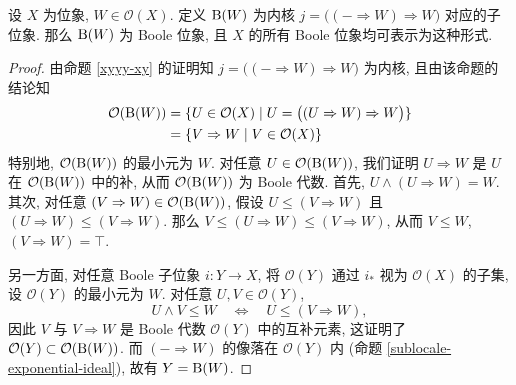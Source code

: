 
\begin{propdef}
	[label={Boolean-sublocale}]
	{}
	设 $X$ 为位象, $W\in\mathcal O(X)$.
	定义 $\text{B}(W)$ 为内核 $j = \big((-\Rightarrow W) \Rightarrow W\big)$ 对应的子位象.
	那么 $\text{B}(W)$ 为 Boole 位象, 且 $X$ 的所有 Boole 位象均可表示为这种形式.
\end{propdef}
\begin{proof}
	由命题 \ref{xyyy-xy} 的证明知 $j = \big((-\Rightarrow W) \Rightarrow W\big)$ 为内核,
	且由该命题的结论知
	$$
	\begin{aligned}
		\mathcal O(\text{B}(W)) &= \{U\in\mathcal O(X) \mid U=\big((U\Rightarrow W)\Rightarrow W\big)\}\\
		&= \{V\Rightarrow W \mid V\in\mathcal O(X)\}
	\end{aligned}
	$$
	特别地, $\mathcal O(\text{B}(W))$ 的最小元为 $W$.
	对任意 $U\in \mathcal O(\text{B}(W))$,
	我们证明 $U\Rightarrow W$ 是 $U$ 在 $\mathcal O(\text{B}(W))$ 中的补, 从而 $\mathcal O(\text{B}(W))$ 为 Boole 代数.
	首先, $U\land (U\Rightarrow W) = W$.
	其次, 对任意 $(V\Rightarrow W)\in \mathcal O(\text{B}(W))$,
	假设 $U\leq (V\Rightarrow W)$ 且 $(U\Rightarrow W) \leq (V\Rightarrow W)$.
	那么 $V\leq (U\Rightarrow W) \leq (V\Rightarrow W)$, 从而 $V\leq W$, $(V\Rightarrow W) = \top$.
	
	另一方面, 对任意 Boole 子位象 $i\colon Y\to X$, 将 $\mathcal O(Y)$ 通过 $i_*$ 视为 $\mathcal O(X)$ 的子集,
	设 $\mathcal O(Y)$ 的最小元为 $W$. 对任意 $U,V\in \mathcal O(Y)$,
	\[
	U\land V\leq W \quad\Leftrightarrow \quad U\leq (V\Rightarrow W),
	\]
	因此 $V$ 与 $V\Rightarrow W$ 是 Boole 代数 $\mathcal O(Y)$ 中的互补元素, 这证明了 $\mathcal O(Y)\subset\mathcal O(\text{B}(W))$.
	而 $(-\Rightarrow W)$ 的像落在 $\mathcal O(Y)$ 内 (命题 \ref{sublocale-exponential-ideal}),
	故有 $Y = \text{B}(W)$.
\end{proof}
